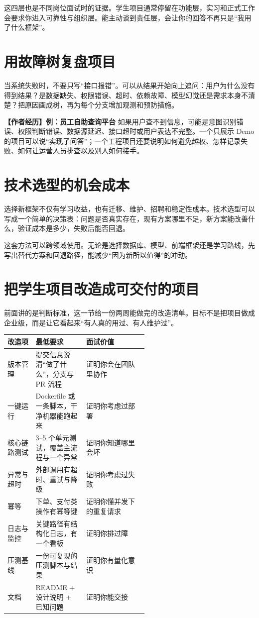\documentclass[UTF8,zihao=5,openany]{ctexbook}
\begin{document}
这四层也是不同岗位面试时的证据。学生项目通常停留在功能层，实习和正式工作会要求你进入可靠性与组织层。能主动谈到责任层，会让你的回答不再只是“我用了什么框架”。

\section{用故障树复盘项目}
当系统失败时，不要只写“接口报错”。可以从结果开始向上追问：用户为什么没有得到结果？是数据缺失、权限错误、超时、依赖故障、模型幻觉还是需求本身不清楚？把原因画成树，再为每个分支增加观测和预防措施。

\begin{casebox}
\textbf{【作者经历】例：员工自助查询平台}
如果用户查不到信息，可能是意图识别错误、权限判断错误、数据源延迟、接口超时或用户表达不完整。一个只展示 Demo 的项目可以说“实现了问答”；一个工程项目还要说明如何避免越权、怎样记录失败、如何让运营人员排查以及别人如何接手。
\end{casebox}

\section{技术选型的机会成本}
选择新框架不仅有学习收益，也有迁移、维护、招聘和稳定性成本。技术选型可以写成一个简单的决策表：问题是否真实存在，现有方案哪里不足，新方案能改善什么，验证成本是多少，失败后能否回退。

这套方法可以跨领域使用。无论是选择数据库、模型、前端框架还是学习路线，先写出替代方案和回退路径，能减少“因为新所以值得”的冲动。

\section{把学生项目改造成可交付的项目}
前面讲的是判断标准，这一节给一份两周能做完的改造清单。目标不是把项目做成企业级，而是让它看起来“有人真的用过、有人维护过”。

\begin{center}\small
\begin{tabularx}{\linewidth}{p{0.20\linewidth}p{0.36\linewidth}Y}
\toprule
改造项 & 最低要求 & 面试价值 \\
\midrule
版本管理 & 提交信息说清“做了什么”，分支与 PR 流程 & 证明你会在团队里协作 \\
一键运行 & Dockerfile 或一条脚本，干净机器能跑起来 & 证明你考虑过部署 \\
核心链路测试 & 3--5 个单元测试，覆盖主流程与一个异常 & 证明你知道哪里会坏 \\
异常与超时 & 外部调用有超时、重试与降级 & 证明你考虑过失败 \\
幂等 & 下单、支付类操作有幂等键 & 证明你懂并发下的重复请求 \\
日志与监控 & 关键路径有结构化日志，有一个看板 & 证明你排过障 \\
压测基线 & 一份可复现的压测脚本与结果 & 证明你有量化意识 \\
文档 & README + 设计说明 + 已知问题 & 证明你能交接 \\
\bottomrule
\end{tabularx}
\end{center}
\end{document}
